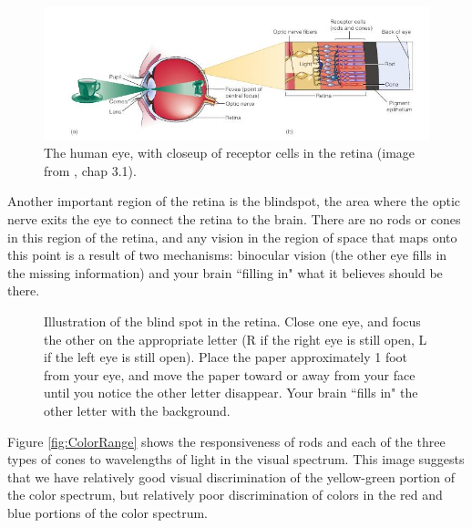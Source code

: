 \documentclass[11pt]{isuthesis}\usepackage[]{graphicx}\usepackage[]{color}
\begin{document}
\begin{figure}
\centering
\includegraphics[width=.8\textwidth, keepaspectratio=TRUE]{Retina}
\caption[The human eye, with closeup of receptor cells in the retina]{The human eye, with closeup of receptor cells in the retina (image from \protect\citealt{goldstein}, chap 3.1).} \label{fig:retina}
\end{figure}

Another important region of the retina is the blindspot, the area where the optic nerve exits the eye to connect the retina to the brain. There are no rods or cones in this region of the retina, and any vision in the region of space that maps onto this point is a result of two mechanisms: binocular vision (the other eye fills in the missing information) and your brain ``filling in" what it believes should be there.

\begin{figure}[htbp]\centering
\begin{center}
\end{center}
\caption[Blind Spot]{Illustration of the blind spot in the retina. Close one eye, and focus the other on the appropriate letter (R if the right eye is still open, L if the left eye is still open). Place the paper approximately 1 foot from your eye, and move the paper toward or away from your face until you notice the other letter disappear. Your brain ``fills in" the other letter with the background.}\label{fig:blindspot}
\end{figure}

Figure \ref{fig:ColorRange} shows the responsiveness of rods and each of the three types of cones to wavelengths of light in the visual spectrum. This image suggests that we have relatively good visual discrimination of the yellow-green portion of the color spectrum, but relatively poor discrimination of colors in the red and blue portions of the color spectrum. 
\end{document}
